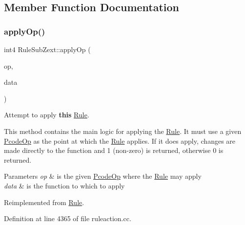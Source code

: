\subsection{Member Function Documentation}
\mbox{\label{class_rule_sub_zext_abefcd055ea0199a4cf71e5f310996d9b}} 
\subsubsection{\texorpdfstring{applyOp()}{applyOp()}}
{\footnotesize\ttfamily int4 Rule\+Sub\+Zext\+::apply\+Op (\begin{DoxyParamCaption}\item[{\mbox{\hyperlink{class_pcode_op}{Pcode\+Op}} $\ast$}]{op,  }\item[{\mbox{\hyperlink{class_funcdata}{Funcdata}} \&}]{data }\end{DoxyParamCaption})\hspace{0.3cm}{\ttfamily [virtual]}}



Attempt to apply {\bfseries{this}} \mbox{\hyperlink{class_rule}{Rule}}. 

This method contains the main logic for applying the \mbox{\hyperlink{class_rule}{Rule}}. It must use a given \mbox{\hyperlink{class_pcode_op}{Pcode\+Op}} as the point at which the \mbox{\hyperlink{class_rule}{Rule}} applies. If it does apply, changes are made directly to the function and 1 (non-\/zero) is returned, otherwise 0 is returned. 
\begin{DoxyParams}{Parameters}
{\em op} & is the given \mbox{\hyperlink{class_pcode_op}{Pcode\+Op}} where the \mbox{\hyperlink{class_rule}{Rule}} may apply \\
\hline
{\em data} & is the function to which to apply \\
\hline
\end{DoxyParams}


Reimplemented from \mbox{\hyperlink{class_rule_a4e3e61f066670175009f60fb9dc60848}{Rule}}.



Definition at line 4365 of file ruleaction.\+cc.

